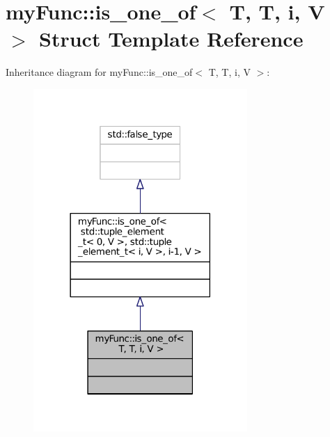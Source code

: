 \hypertarget{structmyFunc_1_1is__one__of_3_01T_00_01T_00_01i_00_01V_01_4}{}\section{my\+Func\+:\+:is\+\_\+one\+\_\+of$<$ T, T, i, V $>$ Struct Template Reference}
\label{structmyFunc_1_1is__one__of_3_01T_00_01T_00_01i_00_01V_01_4}


Inheritance diagram for my\+Func\+:\+:is\+\_\+one\+\_\+of$<$ T, T, i, V $>$\+:
\nopagebreak
\begin{figure}[H]
\begin{center}
\leavevmode
\includegraphics[width=230pt]{structmyFunc_1_1is__one__of_3_01T_00_01T_00_01i_00_01V_01_4__inherit__graph}
\end{center}
\end{figure}


